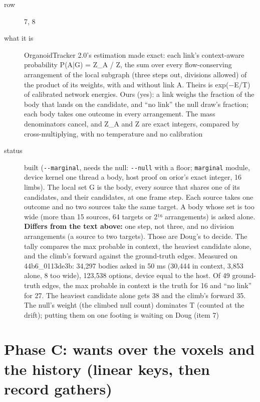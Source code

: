 \begin{description}
\item[{row}] 7, 8
\item[{what it is}] OrganoidTracker 2.0's estimation made exact: each link's context-aware probability P(A|G) = Z\_\allowbreak{}A / Z, the sum over every flow-conserving arrangement of the local subgraph (three steps out, divisions allowed) of the product of its weights, with and without link A. Theirs is exp(−E/T) of calibrated network energies. Ours (yes): a link weighs the fraction of the body that lands on the candidate, and “no link” the null draw's fraction; each body takes one outcome in every arrangement. The mass denominators cancel, and Z\_\allowbreak{}A and Z are exact integers, compared by cross-multiplying, with no temperature and no calibration
\item[{status}] built (\texttt{-\allowbreak{}-\allowbreak{}marginal}, needs the null: \texttt{-\allowbreak{}-\allowbreak{}null} with a floor; \texttt{marginal} module, device kernel one thread a body, host proof on orior's exact integer, 16 limbs). The local set G is the body, every source that shares one of its candidates, and their candidates, at one frame step. Each source takes one outcome and no two sources take the same target. A body whose set is too wide (more than 15 sources, 64 targets or 2¹⁶ arrangements) is asked alone. \textbf{Differs from the text above:} one step, not three, and no division arrangements (a source to two targets). Those are Doug's to decide. The tally compares the max probable in context, the heaviest candidate alone, and the climb's forward against the ground-truth edges. Measured on 44b6\_\allowbreak{}0113de3b: 34,297 bodies asked in 50 ms (30,444 in context, 3,853 alone, 8 too wide), 123,538 options, device equal to the host. Of 49 ground-truth edges, the max probable in context is the truth for 16 and “no link” for 27. The heaviest candidate alone gets 38 and the climb's forward 35. The null's weight (the climbed null count) dominates T (counted at the drift); putting them on one footing is waiting on Doug (item 7)
\end{description}

\section{\texorpdfstring{Phase C: wants over the voxels and the history (linear keys, then record gathers)}{Phase C: wants over the voxels and the history (linear keys, then record gathers)}}

